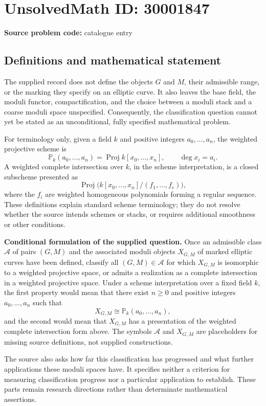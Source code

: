 \documentclass[11pt]{article}
\begin{document}
\section*{UnsolvedMath ID: 30001847}
\textbf{Source problem code:} catalogue entry
\subsection{Definitions and mathematical statement}
The supplied record does not define the objects $G$ and $M$, their admissible range, or the marking they specify on an elliptic curve. It also leaves the base field, the moduli functor, compactification, and the choice between a moduli stack and a coarse moduli space unspecified. Consequently, the classification question cannot yet be stated as an unconditional, fully specified mathematical problem.

For terminology only, given a field $k$ and positive integers $a_0,\ldots,a_n$, the weighted projective scheme is
\[
\mathbb{P}_k(a_0,\ldots,a_n)=\operatorname{Proj} k[x_0,\ldots,x_n],\qquad \deg x_i=a_i.
\]
A weighted complete intersection over $k$, in the scheme interpretation, is a closed subscheme presented as
\[
\operatorname{Proj}\bigl(k[x_0,\ldots,x_n]/(f_1,\ldots,f_c)\bigr),
\]
where the $f_i$ are weighted homogeneous polynomials forming a regular sequence. These definitions explain standard scheme terminology; they do not resolve whether the source intends schemes or stacks, or requires additional smoothness or other conditions.

\textbf{Conditional formulation of the supplied question.} Once an admissible class $\mathcal{A}$ of pairs $(G,M)$ and the associated moduli objects $X_{G,M}$ of marked elliptic curves have been defined, classify all $(G,M)\in\mathcal{A}$ for which $X_{G,M}$ is isomorphic to a weighted projective space, or admits a realization as a complete intersection in a weighted projective space. Under a scheme interpretation over a fixed field $k$, the first property would mean that there exist $n\geq 0$ and positive integers $a_0,\ldots,a_n$ such that
\[
X_{G,M}\cong\mathbb{P}_k(a_0,\ldots,a_n),
\]
and the second would mean that $X_{G,M}$ has a presentation of the weighted complete intersection form above. The symbols $\mathcal{A}$ and $X_{G,M}$ are placeholders for missing source definitions, not supplied constructions.

The source also asks how far this classification has progressed and what further applications these moduli spaces have. It specifies neither a criterion for measuring classification progress nor a particular application to establish. These parts remain research directions rather than determinate mathematical assertions.
\end{document}
